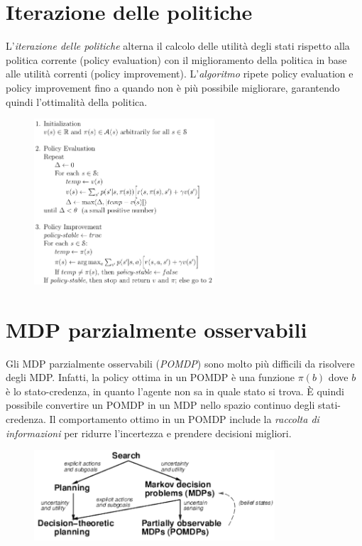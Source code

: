 \documentclass[11pt,oneside]{book}
\begin{document}
\section{Iterazione delle politiche}
L'\textit{iterazione delle politiche} alterna il calcolo delle utilità degli stati rispetto alla politica corrente (policy evaluation) con il miglioramento della politica in base alle utilità correnti (policy improvement). L'\textit{algoritmo} ripete policy evaluation e policy improvement fino a quando non è più possibile migliorare, garantendo quindi l'ottimalità della politica.
\begin{figure}[htp]
	\centering
	\includegraphics[width=0.6\textwidth]{policy-iteration.png}
\end{figure}

\section{MDP parzialmente osservabili}
Gli MDP parzialmente osservabili (\textit{POMDP}) sono molto più difficili da risolvere degli MDP. Infatti, la policy ottima in un POMDP è una funzione $\pi(b)$ dove $b$ è lo stato-credenza, in quanto l'agente non sa in quale stato si trova. \`{E} quindi possibile convertire un POMDP in un MDP nello spazio continuo degli stati-credenza. Il comportamento ottimo in un POMDP include la \textit{raccolta di informazioni} per ridurre l'incertezza e prendere decisioni migliori.
\begin{figure}[htp]
	\centering
	\includegraphics[width=0.8\textwidth]{mdp2.png}
\end{figure}
\end{document}
